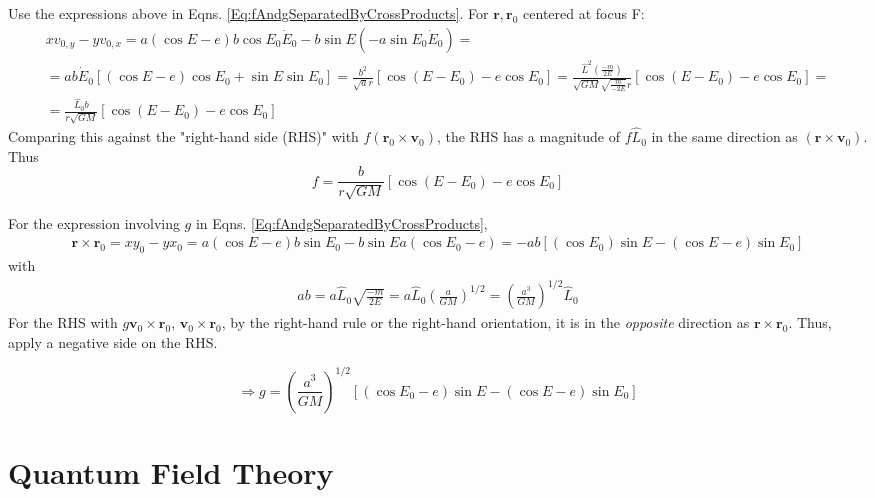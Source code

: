 \documentclass[10pt]{amsart}
\begin{document}
\begin{multicols*}{2}
Use the expressions above in Eqns. \ref{Eq:fAndgSeparatedByCrossProducts}. For $\mathbf{r}, \mathbf{r}_0$ centered at focus F:
\[
\begin{gathered} 
xv_{0, y} - y v_{0,x} = a(\cos{E} - e) b \cos{E_0} \dot{E}_0 - b\sin{E} (-a\sin{E_0} \dot{E}_0) = \\
	= ab\dot{E}_0 \left[ ( \cos{E} - e) \cos{E_0} + \sin{E} \sin{E_0} \right] = \frac{b^2}{ \sqrt{a} r} \left[ \cos{(E - E_0)} - e\cos{E_0} \right] = \frac{ \widehat{L}^2 \left( \frac{-m}{2E} \right) }{ \sqrt{GM} \sqrt{ \frac{m}{-2E} } r } \left[ \cos{(E- E_0)} - e\cos{E_0} \right] = \\
	 = \frac{\widehat{L}_0 b }{ r \sqrt{ GM} } \left[ \cos{ (E- E_0)} - e\cos{E_0} \right] 
\end{gathered} 
\]
Comparing this against the "right-hand side (RHS)" with $f (\mathbf{r}_0 \times \mathbf{v}_0)$, the RHS has a magnitude of $f \widehat{L}_0$ in the same direction as $(\mathbf{r} \times \mathbf{v}_0)$. Thus
\begin{equation}
f = \frac{ b }{ r \sqrt{ GM} } \left[ \cos{ (E- E_0)} - e\cos{E_0} \right]
\end{equation}

For the expression involving $g$ in Eqns. \ref{Eq:fAndgSeparatedByCrossProducts}, 
\[
\begin{gathered}
	\mathbf{r} \times \mathbf{r}_0 = xy_0 - yx_0 = a(\cos{E} - e) b \sin{E_0} - b\sin{E} a (\cos{E_0} - e) = -ab \left[ (\cos{E_0} ) \sin{E} - (\cos{E}-e) \sin{E_0} \right] 
\end{gathered}
\]
with
\[
\begin{gathered}
ab = a \widehat{L}_0 \sqrt{ \frac{-m}{2E} } = a\widehat{L}_0 \left( \frac{a}{GM} \right)^{1/2} = \left( \frac{a^3}{GM} \right)^{1/2} \widehat{L}_0
\end{gathered}
\]
For the RHS with $g \mathbf{v}_0 \times \mathbf{r}_0$, $\mathbf{v}_0 \times \mathbf{r}_0$, by the right-hand rule or the right-hand orientation, it is in the \emph{opposite} direction as $\mathbf{r}\times \mathbf{r}_0$. Thus, apply a negative side on the RHS.

\begin{equation}
\Longrightarrow g = \left( \frac{ a^3}{GM} \right)^{1/2} \left[ (\cos{E_0} - e) \sin{E} - (\cos{E} - e) \sin{E_0} \right] 
\end{equation}

\part{Quantum Field Theory}


\end{multicols*}
\end{document}
